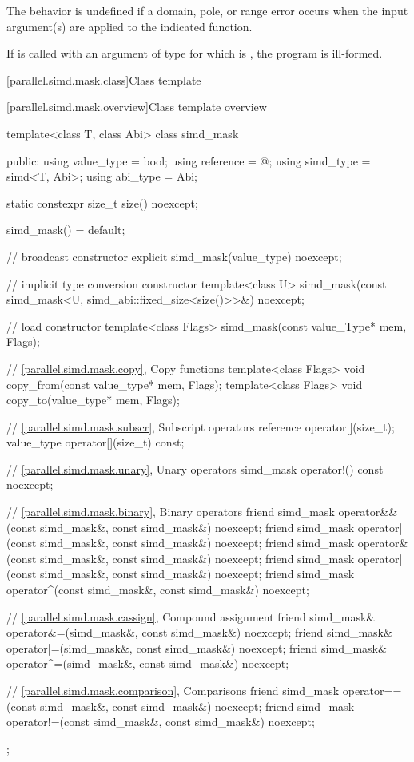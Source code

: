 \pnum
The behavior is undefined if a domain, pole, or range error occurs when the input argument(s) are applied to the indicated  function.

\pnum
If  is called with an argument of type  for which  is , the program is ill-formed.

[parallel.simd.mask.class]{Class template }

[parallel.simd.mask.overview]{Class template  overview}

\begin{codeblock}
template<class T, class Abi> class simd_mask {
public:
  using value_type = bool;
  using reference = @\seebelow@;
  using simd_type = simd<T, Abi>;
  using abi_type = Abi;

  static constexpr size_t size() noexcept;

  simd_mask() = default;

  // broadcast constructor
  explicit simd_mask(value_type) noexcept;

  // implicit type conversion constructor
  template<class U>
    simd_mask(const simd_mask<U, simd_abi::fixed_size<size()>>&) noexcept;

  // load constructor
  template<class Flags> simd_mask(const value_Type* mem, Flags);

  // \ref{parallel.simd.mask.copy}, Copy functions
  template<class Flags> void copy_from(const value_type* mem, Flags);
  template<class Flags> void copy_to(value_type* mem, Flags);

  // \ref{parallel.simd.mask.subscr}, Subscript operators
  reference operator[](size_t);
  value_type operator[](size_t) const;

  // \ref{parallel.simd.mask.unary}, Unary operators
  simd_mask operator!() const noexcept;

  // \ref{parallel.simd.mask.binary}, Binary operators
  friend simd_mask operator&&(const simd_mask&, const simd_mask&) noexcept;
  friend simd_mask operator||(const simd_mask&, const simd_mask&) noexcept;
  friend simd_mask operator&(const simd_mask&, const simd_mask&) noexcept;
  friend simd_mask operator|(const simd_mask&, const simd_mask&) noexcept;
  friend simd_mask operator^(const simd_mask&, const simd_mask&) noexcept;

  // \ref{parallel.simd.mask.cassign}, Compound assignment
  friend simd_mask& operator&=(simd_mask&, const simd_mask&) noexcept;
  friend simd_mask& operator|=(simd_mask&, const simd_mask&) noexcept;
  friend simd_mask& operator^=(simd_mask&, const simd_mask&) noexcept;

  // \ref{parallel.simd.mask.comparison}, Comparisons
  friend simd_mask operator==(const simd_mask&, const simd_mask&) noexcept;
  friend simd_mask operator!=(const simd_mask&, const simd_mask&) noexcept;
};
\end{codeblock}

